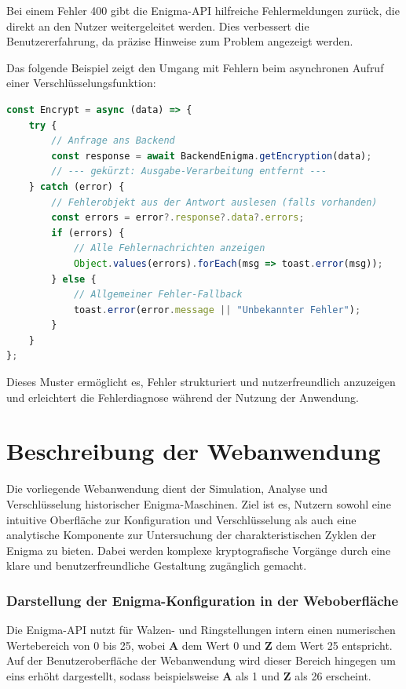 \documentclass[12pt, ngerman, a4paper, numbers=noenddot]{article}
\begin{document}
Bei einem Fehler 400 gibt die Enigma-API hilfreiche Fehlermeldungen zurück, die direkt an den Nutzer weitergeleitet werden. Dies verbessert die Benutzererfahrung, da präzise Hinweise zum Problem angezeigt werden.

Das folgende Beispiel zeigt den Umgang mit Fehlern beim asynchronen Aufruf einer Verschlüsselungsfunktion:

\begin{lstlisting}[language=JavaScript, caption=Fehlerbehandlung mit Toast bei Backend-Anfragen in Vue 3]
const Encrypt = async (data) => {
	try {
		// Anfrage ans Backend
		const response = await BackendEnigma.getEncryption(data);
		// --- gekürzt: Ausgabe-Verarbeitung entfernt ---
	} catch (error) {
		// Fehlerobjekt aus der Antwort auslesen (falls vorhanden)
		const errors = error?.response?.data?.errors;
		if (errors) {
			// Alle Fehlernachrichten anzeigen
			Object.values(errors).forEach(msg => toast.error(msg));
		} else {
			// Allgemeiner Fehler-Fallback
			toast.error(error.message || "Unbekannter Fehler");
		}
	}
};
\end{lstlisting}

Dieses Muster ermöglicht es, Fehler strukturiert und nutzerfreundlich anzuzeigen und erleichtert die Fehlerdiagnose während der Nutzung der Anwendung.


\newpage
\section{Beschreibung der Webanwendung}


Die vorliegende Webanwendung dient der Simulation, Analyse und Verschlüsselung historischer Enigma-Maschinen. Ziel ist es, Nutzern sowohl eine intuitive Oberfläche zur Konfiguration und Verschlüsselung als auch eine analytische Komponente zur Untersuchung der charakteristischen Zyklen der Enigma zu bieten. Dabei werden komplexe kryptografische Vorgänge durch eine klare und benutzerfreundliche Gestaltung zugänglich gemacht.\autocite{enigmawebapp}


\subsubsection*{Darstellung der Enigma-Konfiguration in der Weboberfläche}
Die Enigma-API nutzt für Walzen- und Ringstellungen intern einen numerischen Wertebereich von 0 bis 25, wobei \textbf{A} dem Wert 0 und \textbf{Z} dem Wert 25 entspricht. Auf der Benutzeroberfläche der Webanwendung wird dieser Bereich hingegen um eins erhöht dargestellt, sodass beispielsweise \textbf{A} als 1 und \textbf{Z} als 26 erscheint. 
\end{document}
